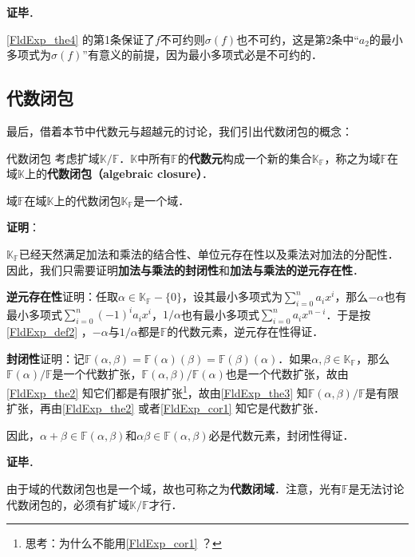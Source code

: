 \textbf{证毕}．

\autoref{FldExp_the4} 的第1条保证了$f$不可约则$\sigma(f)$也不可约，这是第2条中“$a_2$的最小多项式为$\sigma(f)$”有意义的前提，因为最小多项式必是不可约的．








\subsection{代数闭包}

最后，借着本节中代数元与超越元的讨论，我们引出代数闭包的概念：


\begin{definition}{代数闭包}
考虑扩域$\mathbb{K}/\mathbb{F}$．$\mathbb{K}$中所有$\mathbb{F}$的\textbf{代数元}构成一个新的集合$\mathbb{K}_{\mathbb{F}}$，称之为域$\mathbb{F}$在域$\mathbb{K}$上的\textbf{代数闭包（algebraic closure）}．
\end{definition}

\begin{theorem}{}

域$\mathbb{F}$在域$\mathbb{K}$上的代数闭包$\mathbb{K}_{\mathbb{F}}$是一个域．

\end{theorem}

\textbf{证明}：

$\mathbb{K}_{\mathbb{F}}$已经天然满足加法和乘法的结合性、单位元存在性以及乘法对加法的分配性．因此，我们只需要证明\textbf{加法与乘法的封闭性}和\textbf{加法与乘法的逆元存在性}．

\textbf{逆元存在性}证明：任取$\alpha\in\mathbb{K}_{\mathbb{F}}-\{0\}$，设其最小多项式为$\sum_{i=0}^{n}a_ix^i$，那么$-\alpha$也有最小多项式$\sum_{i=0}^n(-1)^ia_ix^i$，$1/\alpha$也有最小多项式$\sum_{i=0}^na_ix^{n-i}$．于是按\autoref{FldExp_def2} ，$-\alpha$与$1/\alpha$都是$\mathbb{F}$的代数元素，逆元存在性得证．

\textbf{封闭性}证明：记$\mathbb{F}(\alpha, \beta)=\mathbb{F}(\alpha)(\beta)=\mathbb{F}(\beta)(\alpha)$．如果$\alpha,\beta\in\mathbb{K}_{\mathbb{F}}$，那么$\mathbb{F}(\alpha)/\mathbb{F}$是一个代数扩张，$\mathbb{F}(\alpha, \beta)/\mathbb{F}(\alpha)$也是一个代数扩张，故由\autoref{FldExp_the2} 知它们都是有限扩张\footnote{思考：为什么不能用\autoref{FldExp_cor1} ？}，故由\autoref{FldExp_the3} 知$\mathbb{F}(\alpha, \beta)/\mathbb{F}$是有限扩张，再由\autoref{FldExp_the2} 或者\autoref{FldExp_cor1} 知它是代数扩张．

因此，$\alpha+\beta\in\mathbb{F}(\alpha, \beta)$和$\alpha\beta\in\mathbb{F}(\alpha, \beta)$必是代数元素，封闭性得证．

\textbf{证毕}．


由于域的代数闭包也是一个域，故也可称之为\textbf{代数闭域}．注意，光有$\mathbb{F}$是无法讨论代数闭包的，必须有扩域$\mathbb{K}/\mathbb{F}$才行．





